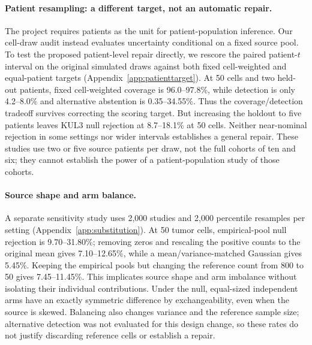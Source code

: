 \paragraph{Patient resampling: a different target, not an automatic repair.}
The project requires patients as the unit for patient-population inference.
Our cell-draw audit instead evaluates uncertainty conditional on a fixed
source pool. To test the proposed patient-level repair directly, we rescore
the paired patient-$t$ interval on the original simulated draws against
both fixed cell-weighted and equal-patient targets
(Appendix~\ref{app:patienttarget}). At 50 cells and two held-out patients,
fixed cell-weighted coverage is 96.0--97.8\%, while detection is only
4.2--8.0\% and alternative abstention is 0.35--34.55\%.
Thus the coverage/detection tradeoff survives correcting the scoring target.
But increasing the holdout to five patients leaves KUL3 null rejection at
8.7--18.1\% at 50 cells. Neither near-nominal rejection in some settings
nor wider intervals establishes a general repair. These studies use two or
five source patients per draw, not the full cohorts of ten and six; they
cannot establish the power of a patient-population study of those cohorts.

\paragraph{Source shape and arm balance.}
A separate sensitivity study uses 2{,}000 studies and 2{,}000 percentile
resamples per setting (Appendix~\ref{app:substitution}). At 50 tumor cells,
empirical-pool null rejection is 9.70--31.80\%; removing zeros and rescaling
the positive counts to the original mean gives 7.10--12.65\%, while a
mean/variance-matched Gaussian gives 5.45\%. Keeping the empirical pools but
changing the reference count from 800 to 50 gives 7.45--11.45\%.
This implicates source shape and arm imbalance without isolating their
individual contributions. Under the null, equal-sized independent arms
have an exactly symmetric difference by exchangeability, even when the
source is skewed. Balancing also changes variance and the reference sample
size; alternative detection was not evaluated for this design change, so
these rates do not justify discarding reference cells or establish a repair.

